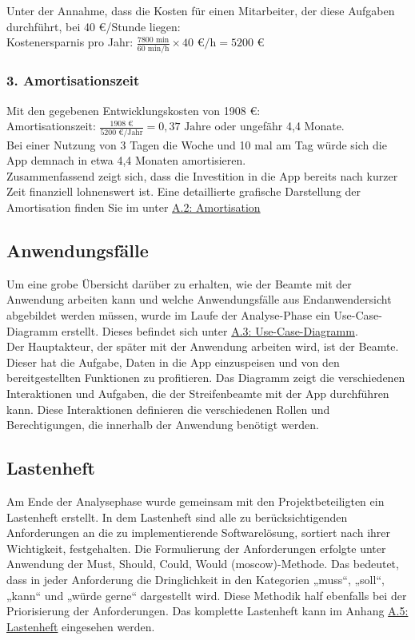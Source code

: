 \documentclass[a4paper,12pt]{article}
\begin{document}
Unter der Annahme, dass die Kosten für einen Mitarbeiter, der diese Aufgaben durchführt, bei 40 €/Stunde liegen:\\
Kostenersparnis pro Jahr: $\frac{7800 \text{ min}}{60 \text{ min/h}} \times 40 \text{ €/h} = 5200 \text{ €}$

\subsubsection*{3. Amortisationszeit}
Mit den gegebenen Entwicklungskosten von 1908 €:\\
Amortisationszeit: $\frac{1908 \text{ €}}{5200 \text{ €/Jahr}} = 0,37 \text{ Jahre}$ oder ungefähr 4,4 Monate.\\
Bei einer Nutzung von 3 Tagen die Woche und 10 mal am Tag würde sich die App demnach in etwa 4,4 Monaten amortisieren.\\
Zusammenfassend zeigt sich, dass die Investition in die App bereits nach kurzer Zeit finanziell lohnenswert ist. Eine detaillierte grafische Darstellung der Amortisation finden Sie im unter  \hyperref[sec:amortisation]{A.2: Amortisation}

\subsection{Anwendungsfälle}
\label{sec:anwendungsfälle}
Um eine grobe Übersicht darüber zu erhalten, wie der Beamte mit der Anwendung arbeiten kann und welche Anwendungsfälle aus Endanwendersicht abgebildet werden müssen, wurde im Laufe der Analyse-Phase ein Use-Case-Diagramm erstellt. Dieses befindet sich unter \hyperref[sec:use-case-diagramm]{A.3: Use-Case-Diagramm}.
\\
Der Hauptakteur, der später mit der Anwendung arbeiten wird, ist der Beamte. Dieser hat die Aufgabe, Daten in die App einzuspeisen und von den bereitgestellten Funktionen zu profitieren. Das Diagramm zeigt die verschiedenen Interaktionen und Aufgaben, die der Streifenbeamte mit der App durchführen kann. Diese Interaktionen definieren die verschiedenen Rollen und Berechtigungen, die innerhalb der Anwendung benötigt werden.

\subsection{Lastenheft}
Am Ende der Analysephase wurde gemeinsam mit den Projektbeteiligten ein Lastenheft erstellt. In dem Lastenheft sind alle zu berücksichtigenden Anforderungen an die zu implementierende Softwarelösung, sortiert nach ihrer Wichtigkeit, festgehalten. Die Formulierung der Anforderungen erfolgte unter Anwendung der Must, Should, Could, Would (\acrshort{moscow})-Methode. Das bedeutet, dass in jeder Anforderung die Dringlichkeit in den Kategorien „muss“, „soll“, „kann“ und „würde gerne“ dargestellt wird. Diese Methodik half ebenfalls bei der Priorisierung der Anforderungen. Das komplette Lastenheft kann im Anhang \hyperref[sec:lastenheft]{A.5: Lastenheft} eingesehen werden.
\end{document}
